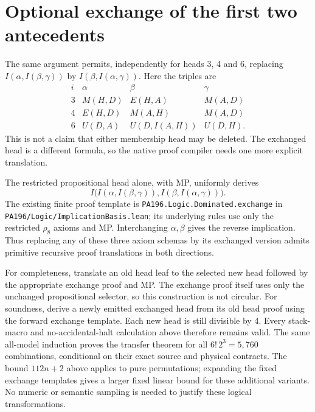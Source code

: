 \documentclass[10pt]{article}
\newcommand{\code}[1]{\texttt{\nolinkurl{#1}}}
\begin{document}
\section{Optional exchange of the first two antecedents}

The same argument permits, independently for heads 3, 4 and 6,
replacing $I(\alpha,I(\beta,\gamma))$ by
$I(\beta,I(\alpha,\gamma))$.  Here the triples are
\[
\begin{array}{c|ccc}
 i&\alpha&\beta&\gamma\\ \hline
 3&M(H,D)&E(H,A)&M(A,D)\\
 4&E(H,D)&M(A,H)&M(A,D)\\
 6&U(D,A)&U(D,I(A,H))&U(D,H).
\end{array}
\]
This is not a claim that either membership head may be deleted.
The exchanged head is a different formula, so the native proof
compiler needs one more explicit translation.

The restricted propositional head alone, with MP, uniformly derives
\[
 I\bigl(I(\alpha,I(\beta,\gamma)),
        I(\beta,I(\alpha,\gamma))\bigr).
\]
The existing finite proof template is
\code{PA196.Logic.Dominated.exchange} in
\code{PA196/Logic/ImplicationBasis.lean}; its underlying rules
use only the restricted $\rho_8$ axioms and MP.  Interchanging
$\alpha,\beta$ gives the reverse implication.  Thus replacing
any of these three axiom schemas by its exchanged version admits
primitive recursive proof translations in both directions.

For completeness, translate an old head leaf to the selected new
head followed by the appropriate exchange proof and MP.  The
exchange proof itself uses only the unchanged propositional
selector, so this construction is not circular.  For soundness,
derive a newly emitted exchanged head from its old head proof
using the forward exchange template.  Each new head is still
divisible by 4.  Every stack-macro and no-accidental-halt calculation
above therefore remains valid.  The same all-model induction proves
the transfer theorem for all $6!\,2^3=5{,}760$ combinations,
conditional on their exact source and physical contracts.  The
bound $112n+2$ above applies to pure permutations; expanding the
fixed exchange templates gives a larger fixed linear bound for
these additional variants.  No numeric or semantic sampling is
needed to justify these logical transformations.
\end{document}
